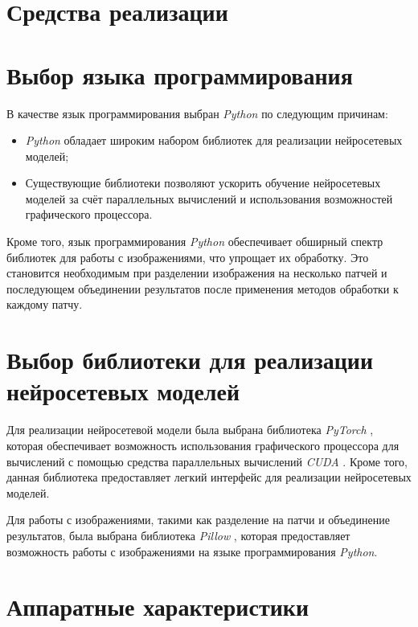 \section{Средства реализации}
\section*{Выбор языка программирования}

В качестве язык программирования выбран \textit{Python} \cite{python} по следующим причинам:

\begin{itemize}
    \item \textit{Python} обладает широким набором библиотек для реализации нейросетевых моделей;
    \item Существующие библиотеки позволяют ускорить обучение нейросетевых моделей за счёт параллельных вычислений и использования возможностей графического процессора.
\end{itemize}

Кроме того, язык программирования \textit{Python} обеспечивает обширный спектр библиотек для работы с изображениями, что упрощает их обработку. Это становится необходимым при разделении изображения на несколько патчей и последующем объединении результатов после применения методов обработки к каждому патчу.

\section*{Выбор библиотеки для реализации нейросетевых моделей}

Для реализации нейросетевой модели была выбрана библиотека \textit{PyTorch} \cite{paszke2019pytorch}, которая обеспечивает возможность использования графического процессора для вычислений с помощью средства параллельных вычислений \textit{CUDA} \cite{nvidia2011cuda}. Кроме того, данная библиотека предоставляет легкий интерфейс для реализации нейросетевых моделей.

Для работы с изображениями, такими как разделение на патчи и объединение результатов, была выбрана библиотека \textit{Pillow} \cite{clark2002python}, которая предоставляет возможность работы с изображениями на языке программирования \textit{Python}.

\section*{Аппаратные характеристики}

